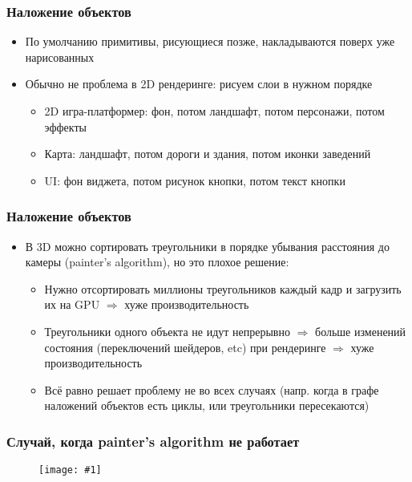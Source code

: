 \documentclass[10pt]{beamer}
\newcommand{\slideimage}[1]{
  \begin{figure}
    \begin{adjustbox}{width=\textwidth, totalheight=\textheight-2\baselineskip-2\baselineskip,keepaspectratio}
      \texttt{[image: \#1]}
    \end{adjustbox}
  \end{figure}
}
\begin{document}
\begin{frame}[fragile]
\frametitle{Наложение объектов}
\begin{itemize}
\item По умолчанию примитивы, рисующиеся позже, накладываются поверх уже нарисованных
\pause
\item Обычно не проблема в 2D рендеринге: рисуем слои в нужном порядке
\pause
\begin{itemize}
\item 2D игра-платформер: фон, потом ландшафт, потом персонажи, потом эффекты
\pause
\item Карта: ландшафт, потом дороги и здания, потом иконки заведений
\pause
\item UI: фон виджета, потом рисунок кнопки, потом текст кнопки
\end{itemize}
\end{itemize}
\end{frame}

\begin{frame}[fragile]
\frametitle{Наложение объектов}
\begin{itemize}
\item В 3D можно сортировать треугольники в порядке убывания расстояния до камеры (painter's algorithm), но это плохое решение:
\pause
\begin{itemize}
\item Нужно отсортировать миллионы треугольников каждый кадр и загрузить их на GPU \begin{math}\Longrightarrow\end{math} хуже производительность
\pause
\item Треугольники одного объекта не идут непрерывно \begin{math}\Longrightarrow\end{math} больше изменений состояния (переключений шейдеров, etc) при рендеринге \begin{math}\Longrightarrow\end{math} хуже производительность
\pause
\item Всё равно решает проблему не во всех случаях (напр. когда в графе наложений объектов есть циклы, или треугольники пересекаются)
\end{itemize}
\end{itemize}
\end{frame}

\begin{frame}[fragile]
\frametitle{Случай, когда painter's algorithm не работает}
\slideimage{painters-fail.png}
\end{frame}
\end{document}
